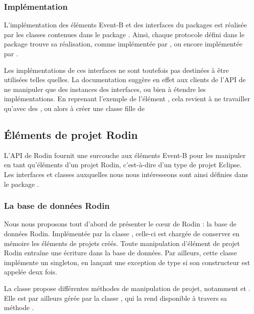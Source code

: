 \subsubsection{Implémentation}

L'implémentation des éléments Event-B et des interfaces du packages  est réalisée par les classes contenues dans %
le package .
Ainsi, chaque protocole défini dans le package  trouve sa réalisation, comme  implémentée par %
, ou encore  implémentée par .

Les implémentations de ces interfaces ne sont toutefois pas destinées à être utilisées telles quelles.
La documentation suggère en effet aux clients de l'API de ne manipuler que des instances des interfaces, ou bien à étendre les implémentations.
En reprenant l'exemple de l'élément , cela revient à ne travailler qu'avec des , ou alors à créer une classe fille de 


\subsection{Éléments de projet Rodin}

L'API de Rodin fournit une surcouche aux éléments Event-B pour les manipuler en tant qu'éléments d'un projet Rodin, c'est-à-dire d'un type de projet Eclipse.
Les interfaces et classes auxquelles nous nous intéresseons sont ainsi définies dans le package .

\subsubsection{La base de données Rodin}

Nous nous proposons tout d'abord de présenter le cœur de Rodin : la base de données Rodin.
Implémentée par la classe , celle-ci est chargée de conserver en mémoire les éléments de projets créés.
Toute manipulation d'élément de projet Rodin entraîne une écriture dans la base de données.
Par ailleurs, cette classe implémente un singleton, en lançant une exception de type  si son constructeur est appelée deux fois.

La classe  propose différentes méthodes de manipulation de projet, notamment  et .
Elle est par ailleurs gérée par la classe , qui la rend disponible à travers sa méthode .


